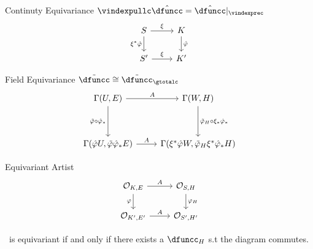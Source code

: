 \documentclass[xcolor={dvipsnames}, handout]{beamer}
\begin{document}
\begin{frame}{Continuty Equivariance $\vindexpullc\hat\dfuncc = \hat\dfuncc|_{\vindexprec}$}
    \begin{equation*}
        \begin{tikzcd}[ampersand replacement =\&]
            S 
            \arrow[r, "\xi"] 
            \arrow[d, "\xi^*\hat\varphi"'] 
            \& 
            K 
            \arrow[d, "\hat\varphi"] \\
            S^{\prime} 
            \arrow[r, "\xi"]
            \& 
            K^{\prime}
            \end{tikzcd}
    \end{equation*}
\end{frame}
\begin{frame}{Field Equivariance $\tilde\dfuncc \cong \tilde\dfuncc_\gtotalc$}
    \begin{equation*}
    \begin{tikzcd}[ampersand replacement=\&, row sep=huge]
        {\Gamma(U, E)} 
        \arrow[r, "A"] 
        \arrow[d, "\tilde\varphi\circ\hat\varphi_*"'] 
        \& 
        {\Gamma(W, H)} 
        \arrow[d, "\tilde\varphi_H\circ\xi_*\hat{\varphi}_*"] \\
        {\Gamma(\hat\varphi U, \tilde\varphi\hat\varphi_*E)} 
        \arrow[r, "A"] 
        \& 
        {\Gamma(\xi^*\hat\varphi W, \tilde\varphi_H\xi^*\hat\varphi_*H)}    
    \end{tikzcd}
    \end{equation*}
\end{frame}

\begin{frame}{Equivariant Artist}
    \begin{equation*}
    \begin{tikzcd}[ampersand replacement=\&]
        {\mathcal{O}_{K, E}} 
        \arrow[r, "A"] 
        \arrow[d, "\varphi"'] \& 
        {\mathcal{O}_{S,H}} 
        \arrow[d, "\varphi_H"] \\
        {\mathcal{O}_{K^{\prime}, E^{\prime}}} 
        \arrow[r, "A"]    \& 
        {\mathcal{O}_{S^{\prime}, H^{\prime}}}    
        \end{tikzcd} 
    \end{equation*}
        \begin{block}
            \vartistc\ is equivariant if and only if there exists a $\dfuncc_H$ s.t the diagram commutes. 
            \begin{equation*}
            \end{equation*}
        \end{block}
    \end{frame}
\end{document}
